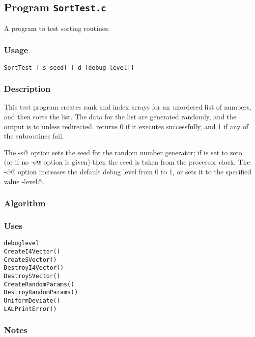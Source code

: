 
\subsection{Program \texttt{SortTest.c}}

A program to test sorting routines.

\subsubsection{Usage}
\begin{verbatim}
SortTest [-s seed] [-d [debug-level]]
\end{verbatim}

\subsubsection{Description}

This test program creates rank and index arrays for an unordered list
of numbers, and then sorts the list.  The data for the list are
generated randomly, and the output is to \verb@stdout@ unless
redirected.  \verb@SortTest@ returns 0 if it executes successfully,
and 1 if any of the subroutines fail.

The \verb@-s@ option sets the seed for the random number generator; if
\verb@seed@ is set to zero (or if no \verb@-s@ option is given) then
the seed is taken from the processor clock.  The \verb@-d@ option
increases the default debug level from 0 to 1, or sets it to the
specified value \verb@debug-level@.


\subsubsection{Algorithm}

\subsubsection{Uses}
\begin{verbatim}
debuglevel
CreateI4Vector()
CreateSVector()
DestroyI4Vector()
DestroySVector()
CreateRandomParams()
DestroyRandomParams()
UniformDeviate()
LALPrintError()
\end{verbatim}

\subsubsection{Notes}

